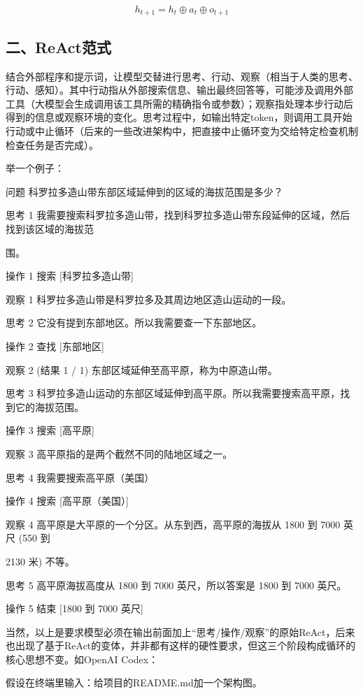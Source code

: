 \[
h_{t+1}=h_t\oplus a_t\oplus o_{t+1}
\]

\hypertarget{ux4e8creactux8303ux5f0f}{%
\subsection{二、ReAct范式}\label{ux4e8creactux8303ux5f0f}}

结合外部程序和提示词，让模型交替进行思考、行动、观察（相当于人类的思考、行动、感知）。其中行动指从外部搜索信息、输出最终回答等，可能涉及调用外部工具（大模型会生成调用该工具所需的精确指令或参数）；观察指处理本步行动后得到的信息或观察环境的变化。思考过程中，如输出特定token，则调用工具开始行动或中止循环（后来的一些改进架构中，把直接中止循环变为交给特定检查机制检查任务是否完成）。

举一个例子：

问题 科罗拉多造山带东部区域延伸到的区域的海拔范围是多少？

思考 1 我需要搜索科罗拉多造山带，找到科罗拉多造山带东段延伸的区域，然后找到该区域的海拔范

围。

操作 1 搜索 {[}科罗拉多造山带{]}

观察 1 科罗拉多造山带是科罗拉多及其周边地区造山运动的一段。

思考 2 它没有提到东部地区。所以我需要查一下东部地区。

操作 2 查找 {[}东部地区{]}

观察 2 (结果 1 / 1) 东部区域延伸至高平原，称为中原造山带。

思考 3 科罗拉多造山运动的东部区域延伸到高平原。所以我需要搜索高平原，找到它的海拔范围。

操作 3 搜索 {[}高平原{]}

观察 3 高平原指的是两个截然不同的陆地区域之一。

思考 4 我需要搜索高平原（美国）

操作 4 搜索 {[}高平原（美国）{]}

观察 4 高平原是大平原的一个分区。从东到西，高平原的海拔从 1800 到 7000 英尺 (550 到

2130 米) 不等。

思考 5 高平原海拔高度从 1800 到 7000 英尺，所以答案是 1800 到 7000 英尺。

操作 5 结束 {[}1800 到 7000 英尺{]}

当然，以上是要求模型必须在输出前面加上``思考/操作/观察''的原始ReAct，后来也出现了基于ReAct的变体，并非都有这样的硬性要求，但这三个阶段构成循环的核心思想不变。如OpenAI Codex：

假设在终端里输入：给项目的README.md加一个架构图。

